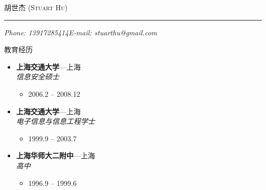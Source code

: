 \documentclass[11pt,oneside]{article}
\makeatletter
\newcommand{\name}{胡世杰 (Stuart Hu)}
\newcommand{\phone}{Phone: 13917285414}
\newcommand{\email}{E-mail: stuarthu@gmail.com}
\newcommand{\bigname}[1]{
	\begin{center}\selectfont\Huge\scshape#1\end{center}
}
\newenvironment{ressection}[1]{
	\vspace{4pt}
	{\selectfont\Large#1}
	\begin{itemize}
	\vspace{3pt}
}{
	\end{itemize}
}
\newcommand{\ressubitem}[1]{
	\vspace{-1pt}
	\item \begin{flushleft} #1 \end{flushleft}
}
\newcommand{\resbigitem}[3]{
	\vspace{-5pt}
	\item
	\textbf{#1}---#2 \\
	\textit{#3}
}
\newenvironment{ressubsec}[3]{
	\resbigitem{#1}{#2}{#3}
	\vspace{-2pt}
	\begin{itemize}
}{
    \end{itemize}
}
\makeatother
\begin{document}
\bigname{\name}

\vspace{-8pt} \rule{\textwidth}{1pt}

\vspace{-1pt} {\small\itshape \phone \hfill \email}

\vspace{8 pt}


\begin{ressection}{教育经历}

	\begin{ressubsec}{上海交通大学}{上海}{信息安全硕士}
		\ressubitem{2006.2 -- 2008.12}
	\end{ressubsec}

	\begin{ressubsec}{上海交通大学}{上海}{电子信息与信息工程学士}
		\ressubitem{1999.9 -- 2003.7}
	\end{ressubsec}

	\begin{ressubsec}{上海华师大二附中}{上海}{高中}
		\ressubitem{1996.9 -- 1999.6}
	\end{ressubsec}

\end{ressection}
\end{document}
